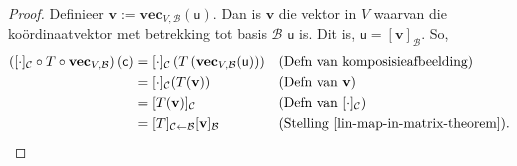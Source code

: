 \documentclass[a4paper,11pt]{book}
\theoremstyle{definition}
\newcommand{\ve}[1]{\mathbf{#1}}
\newcommand{\mat}[1]{\mathsf{#1}}
\newcommand{\basis}[1]{{\mathcal #1}}
\begin{document}
\begin{proof} Definieer $\ve{v} := \ve{vec}_{V, \basis{B}} (\mat{u})$. Dan
	is $\ve{v}$ die vektor in $V$ waarvan die ko{\"o}rdinaatvektor met
	betrekking tot basis $\basis{B}$ $\mat{u}$ is. Dit is, $\mat{u} =
	[\ve{v}]_\basis{B}$.  So,
	\begin{align*}
		\left( [\cdot]_\basis{C} \circ T \circ \ve{vec}_{V, \basis{B}}
		\right) (\mat{c})  &= [ \cdot ]_\basis{C} \left( T
		\left(\ve{vec}_{V, \basis{B}}(\mat{u})\right)\right) && \mbox{(Defn
		van komposisieafbeelding)} \\
		&= [\cdot]_\basis{C} (T(\ve{v})) && \mbox{(Defn van $\ve{v}$)} \\
		&= [T(\ve{v})]_\basis{C} && \mbox{(Defn van $[\cdot]_\basis{C}$)}
		\\
		&= [T]_{\basis{C} \leftarrow \basis{B}} [\ve{v}]_\basis{B} &&
		\mbox{(Stelling \ref{lin-map-in-matrix-theorem})} .
	\end{align*}

\end{proof}
\end{document}
